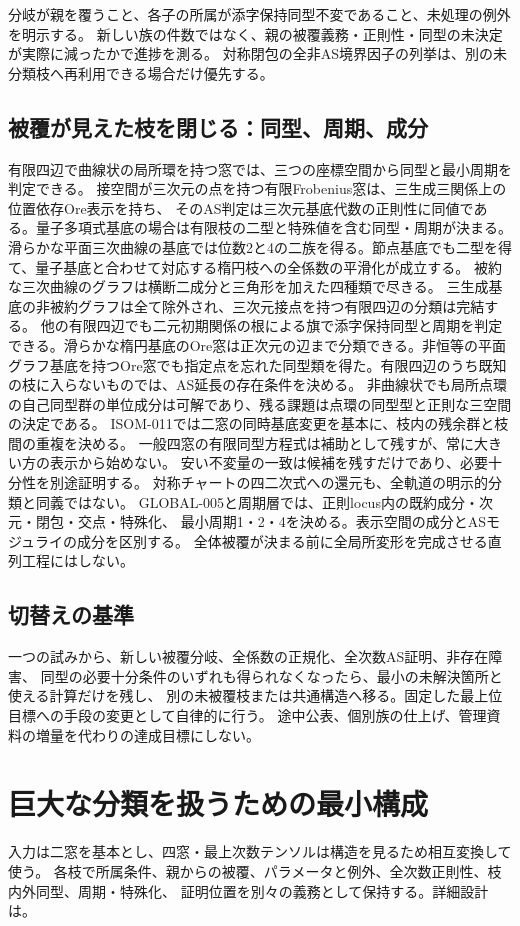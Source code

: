 \documentclass[11pt,a4paper]{ltjsarticle}
\begin{document}
分岐が親を覆うこと、各子の所属が添字保持同型不変であること、未処理の例外を明示する。
新しい族の件数ではなく、親の被覆義務・正則性・同型の未決定が実際に減ったかで進捗を測る。
対称閉包の全非AS境界因子の列挙は、別の未分類枝へ再利用できる場合だけ優先する。

\subsection{被覆が見えた枝を閉じる：同型、周期、成分}
有限四辺で曲線状の局所環を持つ窓では、三つの座標空間から同型と最小周期を判定できる。
接空間が三次元の点を持つ有限Frobenius窓は、三生成三関係上の位置依存Ore表示を持ち、
そのAS判定は三次元基底代数の正則性に同値である。量子多項式基底の場合は有限枝の二型と特殊値を含む同型・周期が決まる。
滑らかな平面三次曲線の基底では位数2と4の二族を得る。節点基底でも二型を得て、量子基底と合わせて対応する楕円枝への全係数の平滑化が成立する。
被約な三次曲線のグラフは横断二成分と三角形を加えた四種類で尽きる。
三生成基底の非被約グラフは全て除外され、三次元接点を持つ有限四辺の分類は完結する。
他の有限四辺でも二元初期関係の根による旗で添字保持同型と周期を判定できる。滑らかな楕円基底のOre窓は正次元の辺まで分類できる。非恒等の平面グラフ基底を持つOre窓でも指定点を忘れた同型類を得た。有限四辺のうち既知の枝に入らないものでは、AS延長の存在条件を決める。
非曲線状でも局所点環の自己同型群の単位成分は可解であり、残る課題は点環の同型型と正則な三空間の決定である。
ISOM-011では二窓の同時基底変更を基本に、枝内の残余群と枝間の重複を決める。
一般四窓の有限同型方程式は補助として残すが、常に大きい方の表示から始めない。
安い不変量の一致は候補を残すだけであり、必要十分性を別途証明する。
対称チャートの四二次式への還元も、全軌道の明示的分類と同義ではない。
GLOBAL-005と周期層では、正則locus内の既約成分・次元・閉包・交点・特殊化、
最小周期1・2・4を決める。表示空間の成分とASモジュライの成分を区別する。
全体被覆が決まる前に全局所変形を完成させる直列工程にはしない。

\subsection{切替えの基準}
一つの試みから、新しい被覆分岐、全係数の正規化、全次数AS証明、非存在障害、
同型の必要十分条件のいずれも得られなくなったら、最小の未解決箇所と使える計算だけを残し、
別の未被覆枝または共通構造へ移る。固定した最上位目標への手段の変更として自律的に行う。
途中公表、個別族の仕上げ、管理資料の増量を代わりの達成目標にしない。

\section{巨大な分類を扱うための最小構成}
入力は二窓を基本とし、四窓・最上次数テンソルは構造を見るため相互変換して使う。
各枝で所属条件、親からの被覆、パラメータと例外、全次数正則性、枝内外同型、周期・特殊化、
証明位置を別々の義務として保持する。詳細設計は。
\end{document}
